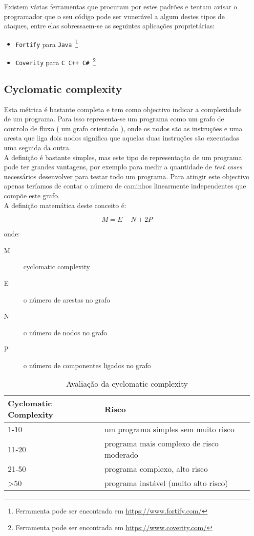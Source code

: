 Existem várias ferramentas que procuram por estes padrões e tentam avisar o programador que o seu código pode ser vunerável a algum destes tipos de ataques, 
entre elas sobressaem-se as seguintes aplicações proprietárias:

\begin{itemize}
\item \texttt{Fortify} para \texttt{Java}~\footnote{Ferramenta pode ser encontrada em \url{https://www.fortify.com/}}
\item \texttt{Coverity} para \texttt{C C++ C\#}~\footnote{Ferramenta pode ser encontrada em \url{https://www.coverity.com/}} 
\end{itemize}

\subsection{Cyclomatic complexity}
Esta métrica é bastante completa e tem como objectivo indicar a complexidade de um programa. Para isso representa-se um programa como um grafo de controlo de fluxo ( um grafo orientado ), onde os nodos são as instruções e uma aresta que liga dois nodos significa que aquelas duas instruções são executadas uma seguida da outra.\\
A definição é bastante simples, mas este tipo de representação de um programa pode ter grandes vantagens, por exemplo para medir a quantidade de \emph{test cases} necessários desenvolver para testar todo um programa. Para atingir este objectivo apenas teríamos de contar o número de caminhos linearmente independentes que compõe este grafo.\\

A definição matemática deste conceito é:

$$M = E - N + 2P$$

onde:

\begin{description}
\item[M] cyclomatic complexity
\item[E] o número de arestas no grafo
\item[N] o número de nodos no grafo
\item[P] o número de componentes ligados no grafo
\end{description}

\begin{table}[htbp]
\begin{center}
\begin{tabular}{|l|l|}\hline
Cyclomatic Complexity & Risco \\\hline
1-10  & um programa simples sem muito risco\\\hline
11-20 & programa mais complexo de risco moderado\\\hline
21-50  & programa complexo, alto risco\\\hline
>50  & programa instável (muito alto risco)\\\hline
\end{tabular}
\caption{Avaliação da cyclomatic complexity}
\end{center}
\end{table}

